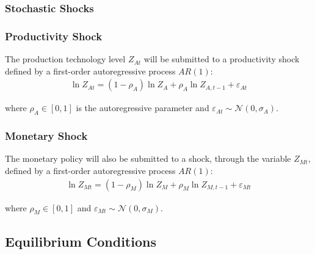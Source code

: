 \documentclass[
thesis.tex
]{subfiles}
\begin{document}
	
	\subsubsection{Stochastic Shocks}\label{sec:stochastic-shocks}
	
	\subsubsection*{Productivity Shock} \label{sec:productivity shock}
	
	The production technology level $Z_{At}$ will be submitted to a productivity shock defined by a first-order autoregressive process $AR(1)$:
	\begin{align}
		\ln{Z_{At}} = (1-\rho_A)\ln{Z_A} + \rho_A\ln{Z_{A,t-1}} + \varepsilon_{At} \label{eq:productivity-shock}
	\end{align}
	
	where $\rho_A \in [0,1]$ is the autoregressive parameter and $\varepsilon_{At} \sim \mathscr{N}(0,\sigma_A)$.
	
	\subsubsection*{Monetary Shock} \label{sec:monetary shock}
	
	The monetary policy will also be submitted to a shock, through the variable $Z_{Mt}$, defined by a first-order autoregressive process $AR(1)$:
	\begin{align}
		\ln{Z_{Mt}} = (1-\rho_M)\ln{Z_{M}} + \rho_M\ln{Z_{M,t-1}} + \varepsilon_{Mt} \label{eq:monetary-shock}
	\end{align}
	
	where $\rho_M \in [0,1]$ and $\varepsilon_{Mt} \sim \mathscr{N}(0,\sigma_M)$.
	
	
	\subsection{Equilibrium Conditions}
	
	
\end{document}
